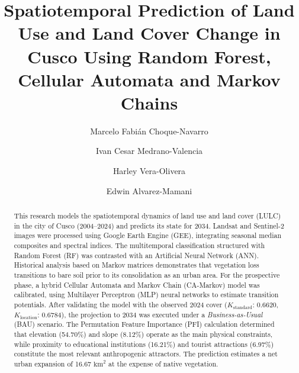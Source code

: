 \documentclass[runningheads]{llncs}
\begin{document}
%
\title{Spatiotemporal Prediction of Land Use and Land Cover Change in Cusco Using Random Forest, Cellular Automata and Markov Chains}

\author{
Marcelo Fabián Choque-Navarro
\and
Ivan Cesar Medrano-Valencia
\and
Harley Vera-Olivera
\and
Edwin Alvarez-Mamani
}



\maketitle    

\begin{abstract}
This research models the spatiotemporal dynamics of land use and land cover (LULC) in the city of Cusco (2004--2024) and predicts its state for 2034. Landsat and Sentinel-2 images were processed using Google Earth Engine (GEE), integrating seasonal median composites and spectral indices. The multitemporal classification structured with Random Forest (RF) was contrasted with an Artificial Neural Network (ANN). Historical analysis based on Markov matrices demonstrates that vegetation loss transitions to bare soil prior to its consolidation as an urban area. For the prospective phase, a hybrid Cellular Automata and Markov Chain (CA-Markov) model was calibrated, using Multilayer Perceptron (MLP) neural networks to estimate transition potentials. After validating the model with the observed 2024 cover ($K_{\text{standard}}$: 0.6620, $K_{\text{location}}$: 0.6784), the projection to 2034 was executed under a \textit{Business-as-Usual} (BAU) scenario. The Permutation Feature Importance (PFI) calculation determined that elevation (54.70\%) and slope (8.12\%) operate as the main physical constraints, while proximity to educational institutions (16.21\%) and tourist attractions (6.97\%) constitute the most relevant anthropogenic attractors. The prediction estimates a net urban expansion of 16.67 $\text{km}^2$ at the expense of native vegetation.


\end{abstract}
\end{document}
